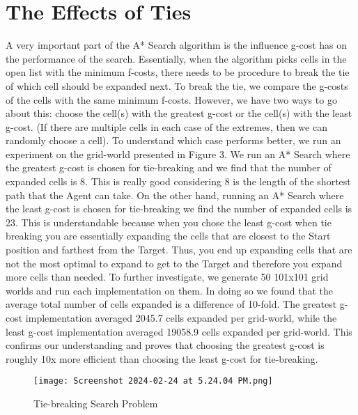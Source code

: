\documentclass{article}
\begin{document}
\section{The Effects of Ties}
A very important part of the A* Search algorithm is the influence g-cost has on the performance of the search. Essentially, when the algorithm picks cells in the open list with the minimum f-costs, there needs to be procedure to break the tie of which cell should be expanded next. To break the tie, we compare the g-costs of the cells with the same minimum f-costs. However, we have two ways to go about this: choose the cell(s) with the greatest g-cost or the cell(s) with the least g-cost. (If there are multiple cells in each case of the extremes, then we can randomly choose a cell). 
\newline 
\newline
To understand which case performs better, we run an experiment on the grid-world presented in Figure 3. We run an A* Search where the greatest g-cost is chosen for tie-breaking  and we find that the number of expanded cells is 8. This is really good considering 8 is the length of the shortest path that the Agent can take. On the other hand, running an A* Search where the least g-cost is chosen for tie-breaking we find the number of expanded cells is 23. This is understandable because when you chose the least g-cost when tie breaking you are essentially expanding the cells that are closest to the Start position and farthest from the Target. Thus, you end up expanding cells that are not the most optimal to expand to get to the Target and therefore you expand more cells than needed. 
\newline
\newline
To further investigate, we generate 50 101x101 grid worlds and run each implementation on them. In doing so we found that the average total number of cells expanded is a difference of 10-fold. The greatest g-cost implementation averaged 2045.7 cells expanded per grid-world, while the least g-cost implementation averaged 19058.9 cells expanded per grid-world. This confirms our understanding and proves that choosing the greatest g-cost is roughly 10x more efficient than choosing the least g-cost for tie-breaking.
\begin{figure}[h]
    \centering
    \texttt{[image: Screenshot 2024-02-24 at 5.24.04 PM.png]}
    \caption{Tie-breaking Search Problem}
    \label{fig:example}
\end{figure}
\end{document}
